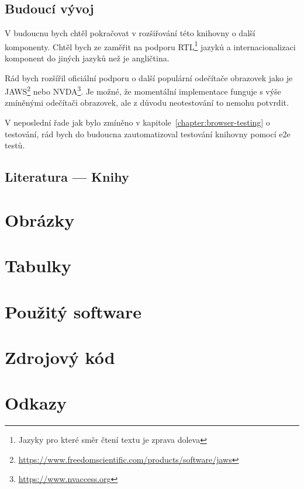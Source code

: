 \documentclass{ctuthesis}
\begin{document}
\section{Budoucí vývoj}

V budoucnu bych chtěl pokračovat v rozšiřování této knihovny o další komponenty.
Chtěl bych ze zaměřit na podporu RTL\footnote{Jazyky pro které směr čtení textu je zprava doleva} jazyků a internacionalizaci komponent do jiných jazyků než je angličtina.

Rád bych rozšířil oficiální podporu o další populární odečítače obrazovek jako je JAWS\footnote{\url{https://www.freedomscientific.com/products/software/jaws}} nebo NVDA\footnote{\url{https://www.nvaccess.org}}.
Je možné, že momentální implementace funguje s výše zmíněnými odečítači obrazovek, ale z důvodu neotestování to nemohu potvrdit.

V neposlední řade jak bylo zmíněno v kapitole~\ref{chapter:browser-testing} o testování, rád bych do budoucna zautomatizoval testování knihovny pomocí \gls{e2e} testů.

\appendix

\printbibliography[title={Seznam literatury}]

\section{Literatura --- Knihy}

\printbibliography[heading=none,type=book]

\chapter{Obrázky}



\chapter{Tabulky}



\chapter{Použitý software}



\chapter{Zdrojový kód}



\chapter{Odkazy}


\end{document}
